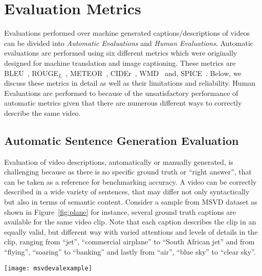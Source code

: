 \documentclass[10pt,journal,compsoc]{IEEEtran}
\begin{document}
\section{Evaluation Metrics}
\label{sec:EvalMetPreamble}
Evaluations performed over machine generated captions/descriptions of videos can be divided into \textit{Automatic Evaluations} and \textit{Human Evaluations}. Automatic evaluations are performed using six different metrics which were originally designed for machine translation and image captioning. These metrics are BLEU~\cite{papineni2002bleu}, ROUGE$_L$~\cite{lin2004rouge}, METEOR~\cite{lavie2005meteor}, CIDEr~\cite{vedantam2015cider}, WMD~\cite{kusner2015word} and, SPICE~\cite{anderson2016spice}. Below, we discuss these metrics in detail as well as their limitations and reliability. Human Evaluations are performed to because of the unsatisfactory performance of automatic metrics given that there are numerous different ways to correctly describe the same video.

\subsection{Automatic Sentence Generation Evaluation}
\label{sec:evalmetricsintro}
Evaluation of video descriptions, automatically or manually generated, is challenging because as there is no specific ground truth or ``right answer'', that can be taken as a reference for benchmarking accuracy. A video can be correctly described in a wide variety of sentences, that may differ not only syntactically but also in terms of semantic content. Consider a sample from MSVD dataset as shown in Figure~\ref{fig:plane} for instance, several ground truth captions are available for the same video clip. Note that each caption describes the clip in an equally valid, but different way with varied attentions and levels of details in the clip, ranging from ``jet'', ``commercial airplane'' to ``South African jet'' and from ``flying'', ``soaring'' to ``banking'' and lastly from ``air'', ``blue sky'' to ``clear sky''. 

\begin{figure*}[htbp] %
   \centering
   \texttt{[image: msvdevalexample]} 
\vspace{-5mm}
   \caption{An example from MSVD~\cite{chen2011collecting} dataset with the associated ground truth captions. Note how the same video clip has been described very differently. Each caption describes the activity wholly or partially in a different way.}
\label{fig:plane}
\end{figure*}
\end{document}
